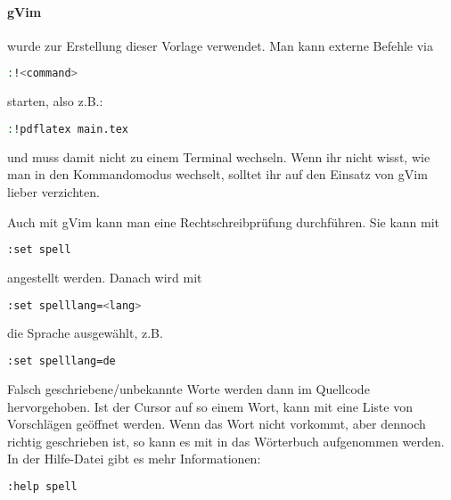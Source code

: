 \paragraph{gVim}
wurde zur Erstellung dieser Vorlage verwendet.
Man kann externe Befehle via
\begin{lstlisting}[language=bash]
:!<command>
\end{lstlisting}
starten, also z.B.:
\begin{lstlisting}[language=bash]
:!pdflatex main.tex
\end{lstlisting}
und muss damit nicht zu einem Terminal wechseln.
Wenn ihr nicht wisst, wie man in den Kommandomodus wechselt, solltet ihr 
auf den Einsatz von gVim lieber verzichten.
%
\par
%
Auch mit gVim kann man eine Rechtschreibprüfung durchführen.
Sie kann mit
\begin{lstlisting}[language=bash]
:set spell
\end{lstlisting}
angestellt werden.
Danach wird mit
\begin{lstlisting}[language=bash]
:set spelllang=<lang>
\end{lstlisting}
die Sprache ausgewählt, z.B.
\begin{lstlisting}[language=bash]
:set spelllang=de
\end{lstlisting}
Falsch geschriebene/unbekannte Worte werden dann im Quellcode hervorgehoben.
Ist der Cursor auf so einem Wort, kann mit  eine Liste von
Vorschlägen geöffnet werden.
Wenn das Wort nicht vorkommt, aber dennoch richtig geschrieben ist, so 
kann es mit  in das Wörterbuch aufgenommen werden.
In der Hilfe-Datei gibt es mehr Informationen:
\begin{lstlisting}[language=bash]
:help spell
\end{lstlisting}
%
%
%
